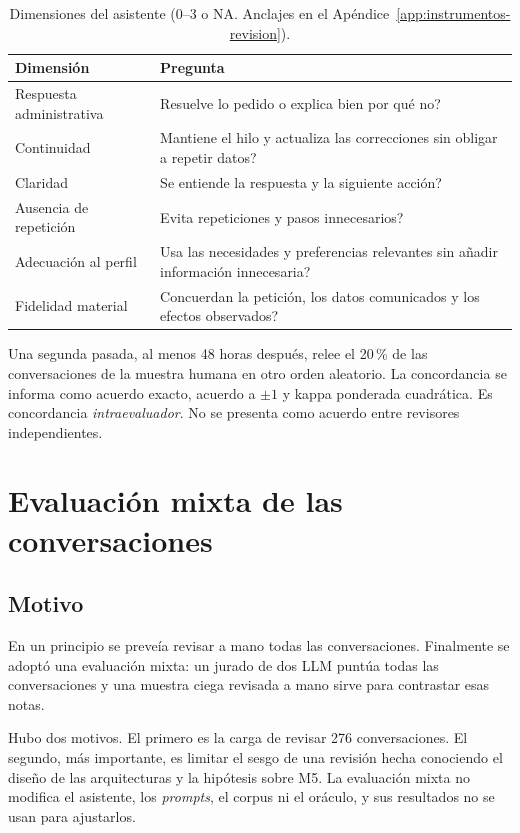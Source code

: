 \begin{table}[!htbp]
\centering
\caption{Dimensiones del asistente (0--3 o NA. Anclajes en el Apéndice~\ref{app:instrumentos-revision}).}
\label{tab:rubrica}
\small
\begin{tabularx}{\textwidth}{L{0.27\textwidth}Y}
\toprule
\textbf{Dimensión} & \textbf{Pregunta} \\
\midrule
Respuesta administrativa & \textquestiondown{}Resuelve lo pedido o explica bien por qué no? \\
Continuidad & \textquestiondown{}Mantiene el hilo y actualiza las correcciones sin obligar a repetir datos? \\
Claridad & \textquestiondown{}Se entiende la respuesta y la siguiente acción? \\
Ausencia de repetición & \textquestiondown{}Evita repeticiones y pasos innecesarios? \\
Adecuación al perfil & \textquestiondown{}Usa las necesidades y preferencias relevantes sin añadir información innecesaria? \\
Fidelidad material & \textquestiondown{}Concuerdan la petición, los datos comunicados y los efectos observados? \\
\bottomrule
\end{tabularx}
\end{table}

Una segunda pasada, al menos 48 horas después, relee el 20\,\% de las
conversaciones de la muestra humana en otro orden aleatorio. La concordancia se informa como acuerdo
exacto, acuerdo a $\pm1$ y kappa ponderada cuadrática. Es concordancia
\emph{intraevaluador}. No se presenta como acuerdo entre revisores
independientes.

\section{Evaluación mixta de las conversaciones}
\label{sec:metodo-mixta}

\subsection{Motivo}

En un principio se preveía revisar a mano todas las conversaciones. Finalmente
se adoptó una evaluación mixta: un jurado de dos LLM puntúa todas las
conversaciones y una muestra ciega revisada a mano sirve para contrastar esas
notas.

Hubo dos motivos. El primero es la carga de revisar 276 conversaciones. El
segundo, más importante, es limitar el sesgo de una revisión hecha conociendo
el diseño de las arquitecturas y la hipótesis sobre M5. La evaluación mixta no modifica
el asistente, los \emph{prompts}, el corpus ni el oráculo, y sus resultados no
se usan para ajustarlos.


